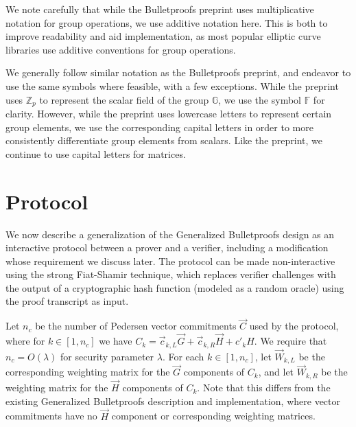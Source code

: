 \documentclass{article}
\newcommand{\GG}{\mathbb{G}}
\newcommand{\FF}{\mathbb{F}}
\newcommand{\mat}[1]{\vec{#1}}
\begin{document}
We note carefully that while the Bulletproofs preprint uses multiplicative notation for group operations, we use additive notation here.
This is both to improve readability and aid implementation, as most popular elliptic curve libraries use additive conventions for group operations.

We generally follow similar notation as the Bulletproofs preprint, and endeavor to use the same symbols where feasible, with a few exceptions.
While the preprint uses $\mathbb{Z}_p$ to represent the scalar field of the group $\GG$, we use the symbol $\FF$ for clarity.
However, while the preprint uses lowercase letters to represent certain group elements, we use the corresponding capital letters in order to more consistently differentiate group elements from scalars.
Like the preprint, we continue to use capital letters for matrices.


\section{Protocol}

We now describe a generalization of the Generalized Bulletproofs design as an interactive protocol between a prover and a verifier, including a modification whose requirement we discuss later.
The protocol can be made non-interactive using the strong Fiat-Shamir technique, which replaces verifier challenges with the output of a cryptographic hash function (modeled as a random oracle) using the proof transcript as input.

Let $n_c$ be the number of Pedersen vector commitments $\vec{C}$ used by the protocol, where for $k \in [1, n_c]$ we have $C_k = \vec{c}_{k,L} \vec{G} + \vec{c}_{k,R} \vec{H} + c'_k H$.
We require that $n_c = O(\lambda)$ for security parameter $\lambda$.
For each $k \in [1, n_c]$, let $\mat{W}_{k,L}$ be the corresponding weighting matrix for the $\vec{G}$ components of $C_k$, and let $\mat{W}_{k,R}$ be the weighting matrix for the $\vec{H}$ components of $C_k$.
Note that this differs from the existing Generalized Bulletproofs description and implementation, where vector commitments have no $\vec{H}$ component or corresponding weighting matrices.
\end{document}
